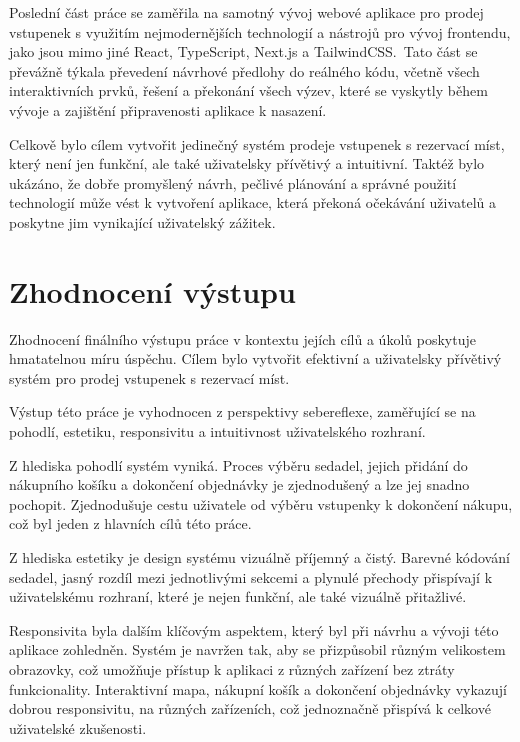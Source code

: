 Poslední část práce se zaměřila na samotný vývoj webové aplikace pro prodej vstupenek s využitím nejmodernějších technologií a nástrojů pro vývoj frontendu, jako jsou mimo jiné React, TypeScript, Next.js a TailwindCSS.\
Tato část se převážně týkala převedení návrhové předlohy do reálného kódu, včetně všech interaktivních prvků, řešení a překonání všech výzev, které se vyskytly během vývoje a zajištění připravenosti aplikace k nasazení.

Celkově bylo cílem vytvořit jedinečný systém prodeje vstupenek s rezervací míst, který není jen funkční, ale také uživatelsky přívětivý a intuitivní.
Taktéž bylo ukázáno, že dobře promyšlený návrh, pečlivé plánování a správné použití technologií může vést k vytvoření aplikace, která překoná očekávání uživatelů a poskytne jim vynikající uživatelský zážitek.

\section*{Zhodnocení výstupu}
\label{sec:zaver-zhodnoceni}
Zhodnocení finálního výstupu práce v kontextu jejích cílů a úkolů poskytuje hmatatelnou míru úspěchu.
Cílem bylo vytvořit efektivní a uživatelsky přívětivý systém pro prodej vstupenek s rezervací míst.

Výstup této práce je vyhodnocen z perspektivy sebereflexe, zaměřující se na pohodlí, estetiku, responsivitu a intuitivnost uživatelského rozhraní.

Z hlediska pohodlí systém vyniká.
Proces výběru sedadel, jejich přidání do nákupního košíku a dokončení objednávky je zjednodušený a lze jej snadno pochopit.
Zjednodušuje cestu uživatele od výběru vstupenky k dokončení nákupu, což byl jeden z hlavních cílů této práce.

Z hlediska estetiky je design systému vizuálně příjemný a čistý.
Barevné kódování sedadel, jasný rozdíl mezi jednotlivými sekcemi a plynulé přechody přispívají k uživatelskému rozhraní, které je nejen funkční, ale také vizuálně přitažlivé.

Responsivita byla dalším klíčovým aspektem, který byl při návrhu a vývoji této aplikace zohledněn.
Systém je navržen tak, aby se přizpůsobil různým velikostem obrazovky, což umožňuje přístup k aplikaci z různých zařízení bez ztráty funkcionality.
Interaktivní mapa, nákupní košík a dokončení objednávky vykazují dobrou responsivitu, na různých zařízeních, což jednoznačně přispívá k celkové uživatelské zkušenosti.

